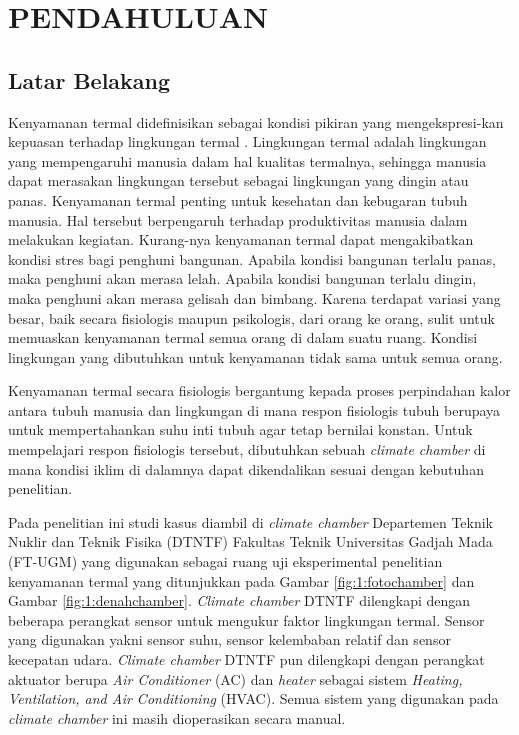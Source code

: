 \chapter{PENDAHULUAN}\label{pendahuluan}
\section{Latar Belakang}\label{latar belakang}

Kenyamanan termal didefinisikan sebagai kondisi pikiran yang mengekspresi-kan kepuasan terhadap lingkungan termal \cite{ASHRAE55}. Lingkungan termal adalah lingkungan yang mempengaruhi manusia dalam hal kualitas termalnya, sehingga manusia dapat merasakan lingkungan tersebut sebagai lingkungan yang dingin atau panas. Kenyamanan termal penting untuk kesehatan dan kebugaran tubuh manusia. Hal tersebut berpengaruh terhadap produktivitas manusia dalam melakukan kegiatan. Kurang-nya kenyamanan termal dapat mengakibatkan kondisi stres bagi penghuni bangunan. Apabila kondisi bangunan terlalu panas, maka penghuni akan merasa lelah. Apabila kondisi bangunan terlalu dingin, maka penghuni akan merasa gelisah dan bimbang. Karena terdapat variasi yang besar, baik secara fisiologis maupun psikologis, dari orang ke orang, sulit untuk memuaskan kenyamanan termal semua orang di dalam suatu ruang. Kondisi lingkungan yang dibutuhkan untuk kenyamanan tidak sama untuk semua orang. 

Kenyamanan termal secara fisiologis bergantung kepada proses perpindahan kalor antara tubuh manusia dan lingkungan di mana respon fisiologis tubuh berupaya untuk mempertahankan suhu inti tubuh agar tetap bernilai konstan. Untuk mempelajari respon fisiologis tersebut, dibutuhkan sebuah \textit{climate chamber} di mana kondisi iklim di dalamnya dapat dikendalikan sesuai dengan kebutuhan penelitian.

Pada penelitian ini studi kasus diambil di \textit{climate chamber} Departemen Teknik Nuklir dan Teknik Fisika (DTNTF) Fakultas Teknik Universitas Gadjah Mada (FT-UGM) yang digunakan sebagai ruang uji eksperimental penelitian kenyamanan termal yang ditunjukkan pada Gambar \ref{fig:1:fotochamber} dan Gambar \ref{fig:1:denahchamber}. \textit{Climate chamber} DTNTF dilengkapi dengan beberapa perangkat sensor untuk mengukur faktor lingkungan termal. Sensor yang digunakan yakni sensor suhu, sensor kelembaban relatif dan sensor kecepatan udara. \textit{Climate chamber} DTNTF pun dilengkapi dengan perangkat aktuator berupa \textit{Air Conditioner} (AC) dan \textit{heater} sebagai sistem \textit{Heating, Ventilation, and Air Conditioning} (HVAC). Semua sistem yang digunakan pada \textit{climate chamber} ini masih dioperasikan secara manual.

